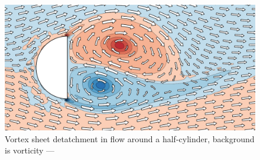 \documentclass[12pt]{article}
\begin{document}
  \thispagestyle{empty}
  \begin{figure}
    \begin{center}
      \includegraphics[width=\textwidth]{compose.pdf}
    \end{center}
    \caption*{Vortex sheet detatchment in flow around a half-cylinder,
      background is vorticity --- \vfplotversion}
  \end{figure}
\end{document}
